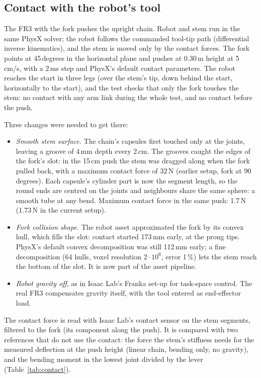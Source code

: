 \documentclass[11pt,a4paper]{article}
\begin{document}
\subsection{Contact with the robot's tool}
\label{sec:contact}

The FR3 with the fork pushes the upright chain. Robot and stem run in the same PhysX solver; the robot follows
the commanded tool-tip path (differential inverse kinematics), and the stem is moved only by the contact forces.
The fork points at 45\,degrees in the horizontal plane and pushes at 0.30\,m height at 5\,cm/s, with a 2\,ms
step and PhysX's default contact parameters. The robot reaches the start in three legs (over the stem's tip,
down behind the start, horizontally to the start), and the test checks that only the fork touches the stem:
no contact with any arm link during the whole test, and no contact before the push.

Three changes were needed to get there:
\begin{itemize}
  \item \emph{Smooth stem surface.} The chain's capsules first touched only at the joints, leaving a groove
        of 4\,mm depth every 2\,cm. The grooves caught the edges of the fork's slot: in the 15\,cm push the
        stem was dragged along when the fork pulled back, with a maximum contact force of 32\,N (earlier setup,
        fork at 90\,degrees). Each capsule's cylinder part is now the segment length, so the round ends are
        centred on the joints and neighbours share the same sphere: a smooth tube at any bend. Maximum contact
        force in the same push: 1.7\,N (1.73\,N in the current setup).
  \item \emph{Fork collision shape.} The robot asset approximated the fork by its convex hull, which fills the
        slot: contact started 173\,mm early, at the prong tips. PhysX's default convex decomposition was still
        112\,mm early; a fine decomposition (64 hulls, voxel resolution $2\cdot10^{6}$, error 1\,\%) lets the
        stem reach the bottom of the slot. It is now part of the asset pipeline.
  \item \emph{Robot gravity off}, as in Isaac Lab's Franka set-up for task-space control. The real FR3
        compensates gravity itself, with the tool entered as end-effector load.
\end{itemize}

The contact force is read with Isaac Lab's contact sensor on the stem segments, filtered to the fork (its
component along the push). It is compared with two references that do not use the contact: the force the
stem's stiffness needs for the measured deflection at the push height (linear chain, bending only, no
gravity), and the bending moment in the lowest joint divided by the lever (Table~\ref{tab:contact}).
\end{document}
